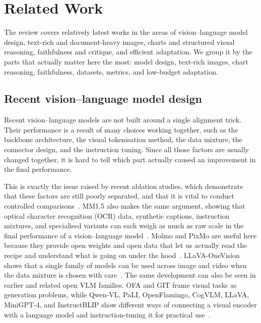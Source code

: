\chapter{Related Work}
The review covers relatively latest works in the areas of vision--language model design,
text-rich and document-heavy images, charts and structured visual reasoning, faithfulness and critique, and efficient adaptation.
We group it by the parts that actually matter here the most: model design, text-rich images, chart reasoning, faithfulness, datasets, metrics, and low-budget adaptation.

\section{Recent vision--language model design}
Recent vision--language models are not built around a single alignment trick.
Their performance is a result of many choices working together, such as the backbone architecture,
the visual tokenisation method, the data mixture, the connector design, and the instruction tuning.
Since all those factors are usually changed together, it is hard to tell which part actually caused an improvement in the final performance.

This is exactly the issue raised by recent ablation studies, 
which demonstrate that these factors are still poorly separated, and that it is vital to conduct controlled comparisons~\cite{laurencon2024whatmatters}.
MM1.5 also makes the same argument, showing that optical character recognition (OCR) data,
synthetic captions, instruction mixtures, and specialised variants 
can each weigh as much as raw scale in the final performance of a vision--language model~\cite{zhang2025mm15}.
Molmo and PixMo are useful here because they provide open weights and open data 
that let us actually read the recipe and understand what is going on under the hood~\cite{deitke2025molmo}.
LLaVA-OneVision shows that a single family of models can be used across image and video when the data mixture is chosen with care~\cite{li2025llavaonevision}.
The same development can also be seen in earlier and related open VLM families.
OFA and GIT frame visual tasks as generation problems,
while Qwen-VL, PaLI, OpenFlamingo, CogVLM, LLaVA, MiniGPT-4, and InstructBLIP show different ways of connecting a visual encoder with a language model and instruction-tuning it for practical use~\cite{wang2022ofa,wang2022git,bai2023qwenvl,chen2023pali,awadalla2023openflamingo,wang2024cogvlm,liu2023llava,zhu2023minigpt4,dai2023instructblip}.

